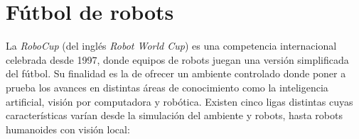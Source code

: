 
\section{Fútbol de robots}

\label{mt_futbolRobots}

La \emph{RoboCup} \cite{robocupHist} (del inglés \emph{Robot World Cup}) es una
competencia internacional celebrada desde 1997, donde equipos de robots juegan
una versión simplificada del fútbol. Su finalidad es la de ofrecer un ambiente
controlado donde poner a prueba los avances en distintas áreas de conocimiento
como la inteligencia artificial, visión por computadora y robótica. Existen
cinco ligas distintas cuyas características varían desde la simulación del
ambiente y robots, hasta robots humanoides con visión local:

